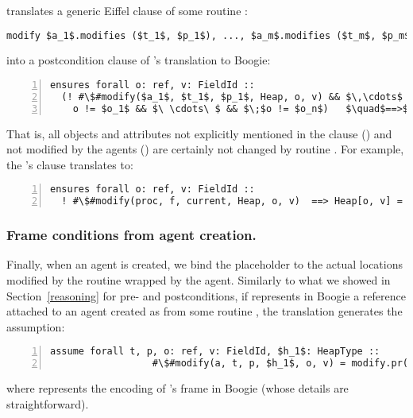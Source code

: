 \AutoProof translates a generic Eiffel  clause of some routine :
\begin{lstlisting}[language=Eiffel, escapechar=\#]
      modify $a_1$.modifies ($t_1$, $p_1$), ..., $a_m$.modifies ($t_m$, $p_m$), $o_1$, ..., $o_n$
\end{lstlisting}
into a postcondition clause of 's translation to Boogie:
\begin{lstlisting}[escapechar=\#,numbers=left,language=Boogie]
 ensures forall o: ref, v: FieldId ::
  (! #\$#modify($a_1$, $t_1$, $p_1$, Heap, o, v) && $\,\cdots$ && ! #\$#modify($a_m$, $t_m$, $p_m$, Heap, o, v) &&
    o != $o_1$ && $\ \cdots\ $ && $\;$o != $o_n$)   $\quad$==>$\quad$ Heap[o, v] = old(Heap)[o, v]
\end{lstlisting} 
That is, all objects and attributes not explicitly mentioned in the  clause () and not modified by the agents () are certainly not changed by routine .
For example, the 's  clause translates to:
\begin{lstlisting}[escapechar=\#,numbers=left,language=Boogie]
 ensures forall o: ref, v: FieldId :: 
  ! #\$#modify(proc, f, current, Heap, o, v)  ==> Heap[o, v] = old(Heap)[o, v]
\end{lstlisting} 





\subsubsection{Frame conditions from agent creation.}
Finally, when an agent is created, we bind the placeholder  to the actual locations modified by the routine wrapped by the agent.
Similarly to what we showed in Section~\ref{reasoning} for pre- and postconditions, if  represents in Boogie a reference attached to an agent created as  from some routine , the translation generates the assumption:
\begin{lstlisting}[escapechar=\#,numbers=left,language=Boogie]
    assume forall t, p, o: ref, v: FieldId, $h_1$: HeapType :: 
                  #\$#modify(a, t, p, $h_1$, o, v) = modify.pr(t, p, $h_1$, o, v);
\end{lstlisting} 
where  represents the encoding of 's frame in Boogie (whose details are straightforward).




